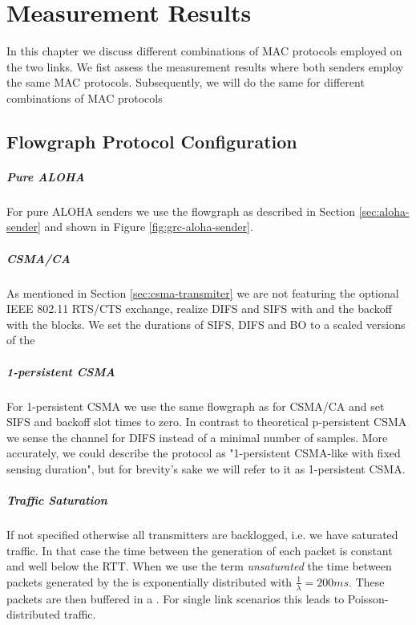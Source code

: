 \chapter{Measurement Results}

In this chapter we discuss different combinations of MAC protocols employed on the two links.  We fist assess the measurement results where both senders employ the same MAC protocols. Subsequently, we will do the same for different combinations of MAC protocols 

\section{Flowgraph Protocol Configuration}

\paragraph{Pure ALOHA}
For pure ALOHA senders we use the flowgraph as described in Section \ref{sec:aloha-sender} and shown in Figure \ref{fig:grc-aloha-sender}. 

\paragraph{CSMA/CA}
As mentioned in Section \ref{sec:csma-transmiter} we are not featuring the optional IEEE 802.11 RTS/CTS exchange, realize DIFS and SIFS with  and the backoff with the  blocks. We set the durations of SIFS, DIFS and BO to a scaled versions of the 

\paragraph{1-persistent CSMA}
For 1-persistent CSMA we use the same flowgraph as for CSMA/CA and set SIFS and backoff slot times to zero. In contrast to theoretical p-persistent CSMA we sense the channel for DIFS instead of a minimal number of samples. More accurately, we could describe the protocol as "1-persistent CSMA-like with fixed sensing duration", but for brevity's sake we will refer to it as 1-persistent CSMA.  
 
\paragraph{Traffic Saturation}
If not specified otherwise all transmitters are backlogged, i.e. we have saturated traffic. In that case the time between the generation of each packet is constant and well below the RTT. When we use the term \emph{unsaturated} the time between packets generated by the  is exponentially distributed with $\frac{1}{\lambda}=200ms$. These packets are then buffered in a . For single link scenarios this leads to Poisson-distributed traffic. 

